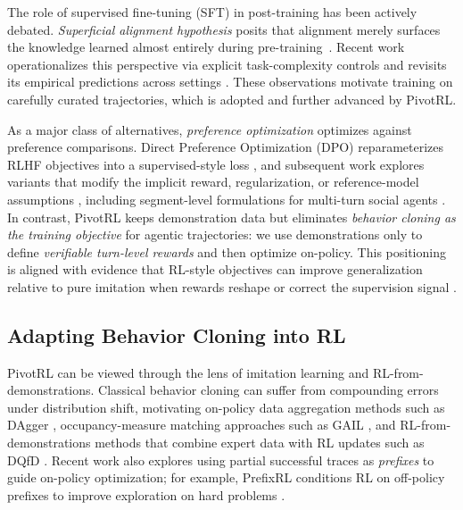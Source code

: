 The role of supervised fine-tuning (SFT) in post-training has been actively debated.
\emph{Superficial alignment hypothesis} posits that alignment  merely surfaces the knowledge learned almost entirely during pre-training~\citep{zhou2023limaalignment}. Recent work operationalizes this perspective via explicit task-complexity controls \citep{vergarabrowne2026sahcomplexity} and revisits its empirical predictions across settings \citep{raghavendra2024revisitingSAH}.
These observations motivate training on  carefully curated trajectories, which is adopted and further advanced by PivotRL.

As a major class of alternatives, \emph{preference optimization} optimizes against preference comparisons.
Direct Preference Optimization (DPO) reparameterizes RLHF objectives into a supervised-style loss \citep{rafailov2023dpo}, and subsequent work explores variants that modify the implicit reward, regularization, or reference-model assumptions \citep{ethayarajh2024kto,hong2024orpo,meng2024simpo}, including segment-level formulations for multi-turn social agents \citep{kong2025sdpo}.
In contrast, PivotRL keeps demonstration data but eliminates \emph{behavior cloning as the training objective} for agentic trajectories: we use demonstrations only to define \emph{verifiable turn-level rewards} and then optimize on-policy.
This positioning is aligned with evidence that RL-style objectives can improve generalization relative to pure imitation when rewards reshape or correct the supervision signal \citep{chu2025sftmemorizesrlgeneralizes,wu2025generalization}.


\subsection{Adapting Behavior Cloning into RL}


PivotRL can be viewed through the lens of imitation learning and RL-from-demonstrations.
Classical behavior cloning can suffer from compounding errors under distribution shift, motivating on-policy data aggregation methods such as DAgger \citep{ross2011dagger}, occupancy-measure matching approaches such as GAIL \citep{ho2016gail}, and RL-from-demonstrations methods that combine expert data with RL updates such as DQfD \citep{hester2018dqfd}.
Recent work also explores using partial successful traces as \emph{prefixes} to guide on-policy optimization; for example, PrefixRL conditions RL on off-policy prefixes to improve exploration on hard problems \citep{setlur2026prefixrl}.

